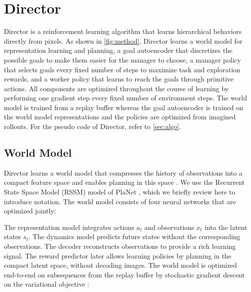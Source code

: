 

\section{Director}
\label{sec:method}

Director is a reinforcement learning algorithm that learns hierarchical behaviors directly from pixels. 
As shown in \cref{fig:method}, Director learns a world model for representation learning and planning, a goal autoencoder that discretizes the possible goals to make them easier for the manager to choose, a manager policy that selects goals every fixed number of steps to maximize task and exploration rewards, and a worker policy that learns to reach the goals through primitive actions.
All components are optimized throughout the course of learning by performing one gradient step every fixed number of environment steps. 
The world model is trained from a replay buffer whereas the goal autoencoder is trained on the world model representations and the policies are optimized from imagined rollouts.
For the pseudo code of Director, refer to \cref{sec:algo}.

\subsection{World Model}
\label{sec:wm}

Director learns a world model that compresses the history of observations into a compact feature space and enables planning in this space \citep{watter2015e2c,zhang2018solar}.
We use the Recurrent State Space Model (RSSM) model of PlaNet \citep{hafner2018planet}, which we briefly review here to introduce notation. 
The world model consists of four neural networks that are optimized jointly:


The representation model integrates actions $a_t$ and observations $x_t$ into the latent states $s_t$.
The dynamics model predicts future states without the corresponding observations.
The decoder reconstructs observations to provide a rich learning signal.
The reward predictor later allows learning policies by planning in the compact latent space, without decoding images. 
The world model is optimized end-to-end on subsequences from the replay buffer by stochastic gradient descent on the variational objective \citep{hinton1993vi,kingma2013vae,rezende2014vae}:

